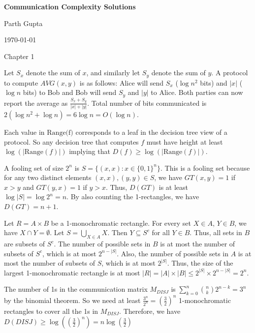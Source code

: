 \documentclass{article} %
\newenvironment{exercise}[2][Exercise]{\begin{trivlist}
\item[\hskip \labelsep {\bfseries #1}\hskip \labelsep {\bfseries #2.}]}{\end{trivlist}}
\newcommand{\maketitletwo}[2][]{\begin{center}
        \Large{\textbf{Communication Complexity Solutions}}
        \vspace{5pt}
        
        \normalsize{Parth Gupta 
        
        \today} 
        \vspace{15pt}
        
\end{center}}
\begin{document}
    \maketitletwo[5]  %
    
    \section{Chapter 1}
    \begin{exercise}{1.5}
        Let $S_x$ denote the sum of $x$, and similarly let $S_y$ denote the sum of $y$. A protocol to compute $AVG(x, y)$ is as follows: Alice will send $S_x$ ($\log n^2$ bits) and $|x|$ ($\log n$ bits) to Bob and Bob will send $S_y$ and $|y|$ to Alice. Both parties can now report the average as $\frac{S_x + S_y}{|x| + |y|}$. Total number of bits communicated is $2(\log n^2 + \log n) = 6\log n = O(\log n)$.
    \end{exercise}

    \begin{exercise}{1.9}
       Each value in $\text{Range(f)}$ corresponds to a leaf in the decision tree view of a protocol. So any decision tree that computes $f$ must have height at least $\log(|\text{Range}(f)|)$ implying that $D(f) \geq \log(|\text{Range}(f)|)$. 
    \end{exercise}

    \begin{exercise}{1.22} A fooling set of size $2^n$ is $S = \{(x, x) : x \in \{0,1\}^n\}$. This is a fooling set because for any two distinct elements $(x, x), (y, y) \in S$, we have $GT(x, y) = 1$ if $x > y$ and $GT(y, x) = 1$ if $y > x$. Thus, $D(GT)$ is at least $\log |S| = \log 2^n = n$. By also counting the 1-rectangles, we have $D(GT) = n + 1$. 
        
    \end{exercise}

    \begin{exercise}{1.26} Let $R = A \times B$ be a 1-monochromatic rectangle. For every set $X \in A$, $Y \in B$, we have $X \cap Y = \emptyset$. Let $S = \bigcup_{X \in A} X$. Then $Y \subseteq S^c$ for all $Y \in B$. Thus, all sets in $B$ are subsets of $S^c$. The number of possible sets in $B$ is at most the number of subsets of $S^c$, which is at most $2^{n - |S|}$. Also, the number of possible sets in $A$ is at most the number of subsets of $S$, which is at most $2^{|S|}$. Thus, the size of the largest 1-monochromatic rectangle is at most $|R| = |A| \times |B| \leq 2^{|S|} \times 2^{n - |S|} = 2^n$.

    The number of 1s in the communication matrix $M_{DISJ}$ is $\sum_{k=0}^{n} \binom{n}{k} 2^{n-k} = 3^n$ by the binomial theorem. So we need at least $\frac{3^n}{2^n} = \left(\frac{3}{2}\right)^n$ 1-monochromatic rectangles to cover all the 1s in $M_{DISJ}$. Therefore, we have $D(DISJ) \geq \log\left(\left(\frac{3}{2}\right)^n\right) = n \log\left(\frac{3}{2}\right)$
    \end{exercise}
\end{document}
